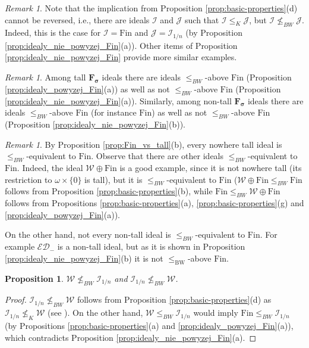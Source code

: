 \documentclass{amsart}
\theoremstyle{plain}
\newtheorem{proposition}[theorem]{Proposition}
\theoremstyle{definition}
\theoremstyle{remark}
\newtheorem{remark}[theorem]{Remark}
\newcommand{\cI}{\mathcal{I}}
\newcommand{\I}{\cI}
\newcommand{\cJ}{\mathcal{J}}
\newcommand{\J}{\cJ}
\newcommand{\fin}{\mathrm{Fin}}
\newcommand{\Fin}{\mathrm{Fin}}
\newcommand{\ED}{\mathcal{ED}}
\newcommand{\BW}{\mathrm{BW}}
\begin{document}
\begin{remark}
\label{rem:BWvsK}
Note that the implication from Proposition \ref{prop:basic-properties}(d) cannot be reversed, i.e., there are ideals $\I$ and $\J$ such that $\I\leq_K\J$, but $\I\not\leq_{BW}\J$. Indeed, this is the case for $\I=\Fin$ and $\J=\I_{1/n}$ (by Proposition \ref{prop:idealy_nie_powyzej_Fin}(a)). Other items of Proposition \ref{prop:idealy_nie_powyzej_Fin} provide more similar examples.
\end{remark}

\begin{remark}
Among tall $\mathbf{F_\sigma}$ ideals there are ideals $\leq_{BW}$-above $\Fin$ (Proposition \ref{prop:idealy_powyzej_Fin}(a)) as well as not $\leq_{BW}$-above $\Fin$ (Proposition \ref{prop:idealy_nie_powyzej_Fin}(a)). Similarly, among non-tall $\mathbf{F_\sigma}$ ideals there are ideals $\leq_{BW}$-above $\Fin$ (for instance $\Fin$) as well as not $\leq_{BW}$-above $\Fin$ (Proposition \ref{prop:idealy_nie_powyzej_Fin}(b)).
\end{remark}

\begin{remark}
\label{rem:nowhere tall vs non-tall}
By Proposition \ref{prop:Fin_vs_tall}(b), every nowhere tall ideal is $\leq_{BW}$-equivalent to $\Fin$. Observe that there are other ideals $\leq_{BW}$-equivalent to $\Fin$. Indeed, the ideal $\mathcal{W}\oplus\Fin$ is a good example, since it is not nowhere tall (its restriction to $\omega\times\{0\}$ is tall), but it is $\leq_{BW}$-equivalent to $\Fin$ ($\mathcal{W}\oplus\Fin\leq_{BW}\Fin$ follows from Proposition \ref{prop:basic-properties}(b), while $\Fin\leq_{BW}\mathcal{W}\oplus\Fin$ follows from Propositions \ref{prop:basic-properties}(a), \ref{prop:basic-properties}(g) and \ref{prop:idealy_powyzej_Fin}(a)).

On the other hand, not every non-tall ideal is $\leq_{BW}$-equivalent to $\Fin$. For example $\ED_-$ is a non-tall ideal, but as it is shown in Proposition \ref{prop:idealy_nie_powyzej_Fin}(b) it is not $\leq_\BW$-above $\fin$.
\end{remark}

\begin{proposition}
\label{prop:WvsSummable}
$\mathcal{W}\not\leq_{BW}\I_{1/n}$ and $\I_{1/n}\not\leq_{BW}\mathcal{W}$.
\end{proposition}

\begin{proof}
$\I_{1/n}\not\leq_{BW}\mathcal{W}$ follows from Proposition \ref{prop:basic-properties}(d) as $\I_{1/n}\not\leq_{K}\mathcal{W}$ (see \cite[Proposition 4.1]{MR4797304}). On the other hand, $\mathcal{W}\leq_{BW}\I_{1/n}$ would imply $\Fin\leq_{BW}\I_{1/n}$ (by Propositions \ref{prop:basic-properties}(a) and \ref{prop:idealy_powyzej_Fin}(a)), which contradicts Proposition \ref{prop:idealy_nie_powyzej_Fin}(a).
\end{proof}
\end{document}
